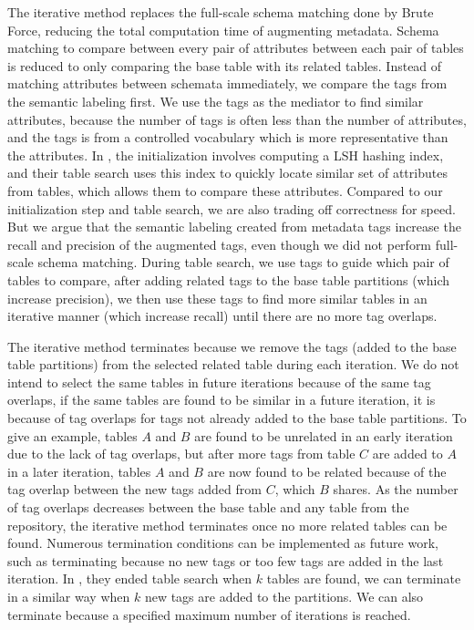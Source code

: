 The iterative method replaces the full-scale schema matching done by Brute Force, reducing the total computation time of augmenting metadata. Schema matching to compare between every pair of attributes between each pair of tables is reduced to only comparing the base table with its related tables. Instead of matching attributes between schemata immediately, we compare the tags from the semantic labeling first. We use the tags as the mediator to find similar attributes, because the number of tags is often less than the number of attributes, and the tags is from a controlled vocabulary which is more representative than the attributes. In \cite{Moawed2018Arabian}, the initialization involves computing a LSH hashing index, and their table search uses this index to quickly locate similar set of attributes from tables, which allows them to compare these attributes. Compared to our initialization step and table search, we are also trading off correctness for speed. But we argue that the semantic labeling created from metadata tags increase the recall and precision of the augmented tags, even though we did not perform full-scale schema matching. During table search, we use tags to guide which pair of tables to compare, after adding related tags to the base table partitions (which increase precision), we then use these tags to find more similar tables in an iterative manner (which increase recall) until there are no more tag overlaps.

The iterative method terminates because we remove the tags (added to the base table partitions) from the selected related table during each iteration. We do not intend to select the same tables in future iterations because of the same tag overlaps, if the same tables are found to be similar in a future iteration, it is because of tag overlaps for tags not already added to the base table partitions. To give an example, tables $A$ and $B$ are found to be unrelated in an early iteration due to the lack of tag overlaps, but after more tags from table $C$ are added to $A$ in a later iteration, tables $A$ and $B$ are now found to be related because of the tag overlap between the new tags added from $C$, which $B$ shares. As the number of tag overlaps decreases between the base table and any table from the repository, the iterative method terminates once no more related tables can be found. Numerous termination conditions can be implemented as future work, such as terminating because no new tags or too few tags are added in the last iteration. In \cite{Nargesian2018Table}, they ended table search when $k$ tables are found, we can terminate in a similar way when $k$ new tags are added to the partitions. We can also terminate because a specified maximum number of iterations is reached.

